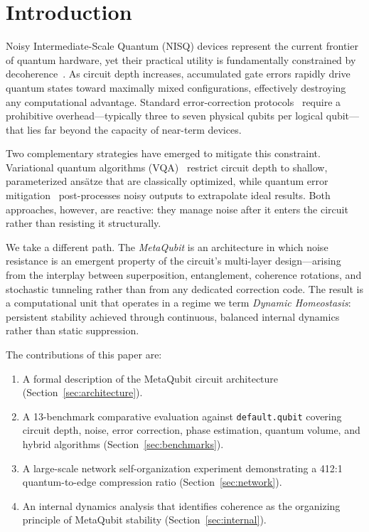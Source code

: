 \documentclass[twocolumn,amsmath,amssymb,prl]{revtex4-2}
\begin{document}
\section{Introduction}
\label{sec:intro}

Noisy Intermediate-Scale Quantum (NISQ) devices represent the current frontier
of quantum hardware, yet their practical utility is fundamentally constrained by
decoherence~\cite{Preskill2018}.  As circuit depth increases, accumulated gate
errors rapidly drive quantum states toward maximally mixed configurations,
effectively destroying any computational advantage.  Standard error-correction
protocols~\cite{Shor1995,Steane1996} require a prohibitive overhead—typically
three to seven physical qubits per logical qubit—that lies far beyond the
capacity of near-term devices.

Two complementary strategies have emerged to mitigate this constraint.
Variational quantum algorithms (VQA)~\cite{Cerezo2021} restrict circuit depth to
shallow, parameterized ans\"{a}tze that are classically optimized, while
quantum error mitigation~\cite{Temme2017} post-processes noisy outputs to
extrapolate ideal results.  Both approaches, however, are reactive: they manage
noise after it enters the circuit rather than resisting it structurally.

We take a different path.  The \emph{MetaQubit} is an architecture in which
noise resistance is an emergent property of the circuit's multi-layer
design—arising from the interplay between superposition, entanglement, coherence
rotations, and stochastic tunneling rather than from any dedicated
correction code.  The result is a computational unit that operates in a
regime we term \emph{Dynamic Homeostasis}: persistent stability achieved through
continuous, balanced internal dynamics rather than static suppression.

The contributions of this paper are:
\begin{enumerate}
  \item A formal description of the MetaQubit circuit architecture
        (Section~\ref{sec:architecture}).
  \item A 13-benchmark comparative evaluation against \texttt{default.qubit}
        covering circuit depth, noise, error correction, phase estimation,
        quantum volume, and hybrid algorithms (Section~\ref{sec:benchmarks}).
  \item A large-scale network self-organization experiment demonstrating a
        412:1 quantum-to-edge compression ratio
        (Section~\ref{sec:network}).
  \item An internal dynamics analysis that identifies coherence as the
        organizing principle of MetaQubit stability
        (Section~\ref{sec:internal}).
\end{enumerate}
\end{document}
